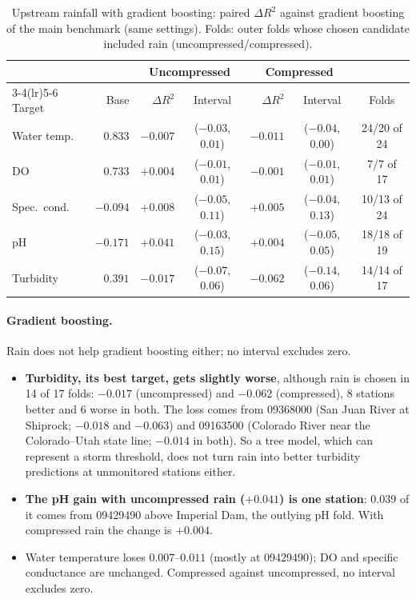 \documentclass[11pt]{article}
\begin{document}
\begin{table}[h]
\centering
\small
\caption{Upstream rainfall with gradient boosting: paired $\Delta R^2$ against gradient boosting of the
main benchmark (same settings). Folds: outer folds whose chosen candidate included rain
(uncompressed/compressed).}
\label{tab:raingb}
\footnotesize
\setlength{\tabcolsep}{4pt}
\begin{tabular}{l r rc rc c}
\toprule
 & & \multicolumn{2}{c}{Uncompressed} & \multicolumn{2}{c}{Compressed} & \\
\cmidrule(lr){3-4}\cmidrule(lr){5-6}
Target & Base & $\Delta R^2$ & Interval & $\Delta R^2$ & Interval & Folds \\
\midrule
Water temp.  & $0.833$  & $-0.007$ & ($-0.03$, $0.01$) & $-0.011$ & ($-0.04$, $0.00$) & 24/20 of 24 \\
DO           & $0.733$  & $+0.004$ & ($-0.01$, $0.01$) & $-0.001$ & ($-0.01$, $0.01$) & 7/7 of 17 \\
Spec.\ cond. & $-0.094$ & $+0.008$ & ($-0.05$, $0.11$) & $+0.005$ & ($-0.04$, $0.13$) & 10/13 of 24 \\
pH           & $-0.171$ & $+0.041$ & ($-0.03$, $0.15$) & $+0.004$ & ($-0.05$, $0.05$) & 18/18 of 19 \\
Turbidity    & $0.391$  & $-0.017$ & ($-0.07$, $0.06$) & $-0.062$ & ($-0.14$, $0.06$) & 14/14 of 17 \\
\bottomrule
\end{tabular}
\end{table}

\paragraph{Gradient boosting.} Rain does not help gradient boosting either; no interval excludes zero.
\begin{itemize}
  \item \textbf{Turbidity, its best target, gets slightly worse}, although rain is chosen in 14 of 17
        folds: $-0.017$ (uncompressed) and $-0.062$ (compressed), 8 stations better and 6 worse in
        both. The loss comes from 09368000 (San Juan River at Shiprock; $-0.018$ and $-0.063$) and
        09163500 (Colorado River near the Colorado--Utah state line; $-0.014$ in both). So a tree
        model, which can represent a storm threshold, does not turn rain into better turbidity
        predictions at unmonitored stations either.
  \item \textbf{The pH gain with uncompressed rain ($+0.041$) is one station}: $0.039$ of it comes
        from 09429490 above Imperial Dam, the outlying pH fold. With compressed rain the change is
        $+0.004$.
  \item Water temperature loses $0.007$--$0.011$ (mostly at 09429490); DO and specific
        conductance are unchanged. Compressed against uncompressed, no interval excludes zero.
\end{itemize}
\end{document}
